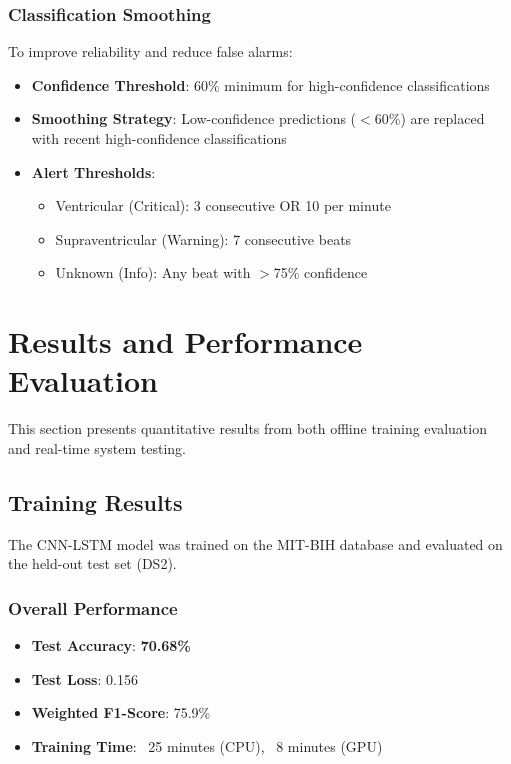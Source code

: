 \documentclass[12pt,a4paper]{article}
\begin{document}
\subsubsection{Classification Smoothing}

To improve reliability and reduce false alarms:

\begin{itemize}
    \item \textbf{Confidence Threshold}: 60\% minimum for high-confidence classifications
    \item \textbf{Smoothing Strategy}: Low-confidence predictions ($<$60\%) are replaced with recent high-confidence classifications
    \item \textbf{Alert Thresholds}:
    \begin{itemize}
        \item Ventricular (Critical): 3 consecutive OR 10 per minute
        \item Supraventricular (Warning): 7 consecutive beats
        \item Unknown (Info): Any beat with $>$75\% confidence
    \end{itemize}
\end{itemize}

\section{Results and Performance Evaluation}

This section presents quantitative results from both offline training evaluation and real-time system testing.

\subsection{Training Results}

The CNN-LSTM model was trained on the MIT-BIH database and evaluated on the held-out test set (DS2).

\subsubsection{Overall Performance}

\begin{itemize}
    \item \textbf{Test Accuracy}: \textbf{70.68\%}
    \item \textbf{Test Loss}: 0.156
    \item \textbf{Weighted F1-Score}: 75.9\%
    \item \textbf{Training Time}: ~25 minutes (CPU), ~8 minutes (GPU)
\end{itemize}
\end{document}
